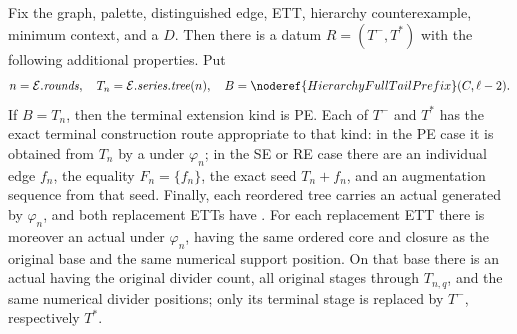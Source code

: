 \begin{lemma}
Fix the graph, palette, distinguished edge, ETT, hierarchy
counterexample, minimum context, and a
 \(D\).  Then there is a
 datum
\(R=(T^-,T^*)\) with the following additional properties.  Put
\[
 n=\mathcal E.\mathit{rounds},\quad
 T_n=\mathcal E.\mathit{series}.\mathit{tree}(n),\quad
 B=\noderef{HierarchyFullTailPrefix}(C,\ell-2).
\]
If \(B=T_n\), then the terminal extension kind is PE.  Each of \(T^-\)
and \(T^*\) has the exact terminal construction route appropriate to
that kind: in the PE case it is obtained from \(T_n\) by a
 under \(\varphi_n\); in the SE
or RE case there are an individual edge \(f_n\), the equality
\(F_n=\{f_n\}\), the exact seed \(T_n+f_n\), and an augmentation
sequence from that seed.  Finally, each reordered tree carries an actual
 generated by
\(\varphi_n\), and both replacement ETTs have
.  For each replacement ETT there is moreover
an actual  under \(\varphi_n\), having the same
ordered core and closure as the original base and the same numerical
support position.  On that base there is an actual
 having the original divider count, all
original stages through \(T_{n,q}\), and the same numerical divider
positions; only its terminal stage is replaced by \(T^-\), respectively
\(T^*\).
\end{lemma}
